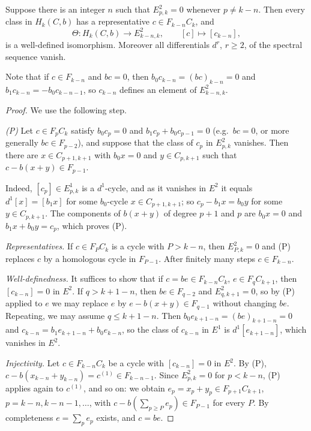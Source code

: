 \begin{proposition}\label{hochschild:prop:convergence}
Suppose there is an integer $n$ such that $E^2_{p,k}=0$ whenever $p\ne k-n$.
Then every class in $H_k(C,b)$ has a representative $c\in F_{k-n}C_k$, and
\begin{equation*}
  \Theta:H_k(C,b)\longrightarrow E^2_{k-n,k},\qquad [c]\longmapsto[c_{k-n}],
\end{equation*}
is a well-defined isomorphism. Moreover all differentials $d^r$, $r\ge2$, of
the spectral sequence vanish.
\end{proposition}

Note that if $c\in F_{k-n}$ and $bc=0$, then $b_0c_{k-n}=(bc)_{k-n}=0$ and
$b_1c_{k-n}=-b_0c_{k-n-1}$, so $c_{k-n}$ defines an element of $E^2_{k-n,k}$.

\begin{proof}
We use the following step.

\emph{(P)} Let $c\in F_pC_k$ satisfy $b_0c_p=0$ and $b_1c_p+b_0c_{p-1}=0$
(e.g.\ $bc=0$, or more generally $bc\in F_{p-2}$), and suppose that the class
of $c_p$ in $E^2_{p,k}$ vanishes. Then there are $x\in C_{p+1,k+1}$ with
$b_0x=0$ and $y\in C_{p,k+1}$ such that $c-b(x+y)\in F_{p-1}$.

Indeed, $[c_p]\in E^1_{p,k}$ is a $d^1$-cycle, and as it vanishes in $E^2$
it equals $d^1[x]=[b_1x]$ for some $b_0$-cycle $x\in C_{p+1,k+1}$; so
$c_p-b_1x=b_0y$ for some $y\in C_{p,k+1}$. The components of $b(x+y)$ of
degree $p+1$ and $p$ are $b_0x=0$ and $b_1x+b_0y=c_p$, which proves (P).

\emph{Representatives.} If $c\in F_PC_k$ is a cycle with $P>k-n$, then
$E^2_{P,k}=0$ and (P) replaces $c$ by a homologous cycle in $F_{P-1}$. After
finitely many steps $c\in F_{k-n}$.

\emph{Well-definedness.} It suffices to show that if $c=be\in F_{k-n}C_k$,
$e\in F_qC_{k+1}$, then $[c_{k-n}]=0$ in $E^2$. If $q>k+1-n$, then $be\in
F_{q-2}$ and $E^2_{q,k+1}=0$, so by (P) applied to $e$ we may replace $e$ by
$e-b(x+y)\in F_{q-1}$ without changing $be$. Repeating, we may assume $q\le
k+1-n$. Then $b_0e_{k+1-n}=(be)_{k+1-n}=0$ and
$c_{k-n}=b_1e_{k+1-n}+b_0e_{k-n}$, so the class of $c_{k-n}$ in $E^1$ is
$d^1[e_{k+1-n}]$, which vanishes in $E^2$.

\emph{Injectivity.} Let $c\in F_{k-n}C_k$ be a cycle with $[c_{k-n}]=0$ in
$E^2$. By (P), $c-b(x_{k-n}+y_{k-n})=c^{(1)}\in F_{k-n-1}$. Since
$E^2_{p,k}=0$ for $p<k-n$, (P) applies again to $c^{(1)}$, and so on: we
obtain $e_p=x_p+y_p\in F_{p+1}C_{k+1}$, $p=k-n,k-n-1,\dots$, with
$c-b(\sum_{p\ge P}e_p)\in F_{P-1}$ for every $P$. By completeness
$e=\sum_pe_p$ exists, and $c=be$.


\end{proof}
